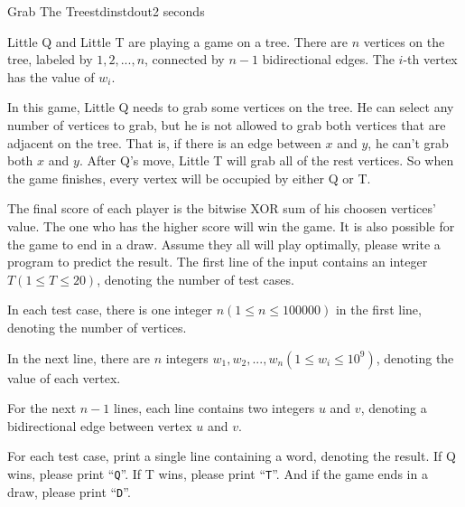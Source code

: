 \documentclass[11pt,a4paper,oneside]{article}
\newcommand{\txt}[1]{\mbox{``\texttt{#1}''}}
\newcommand{\timeLimit}{2 seconds}
\renewcommand{\defaultmemorylimit}{512 megabytes}
\begin{document}
\begin{problem}{Grab The Tree}{stdin}{stdout}{\timeLimit}

Little Q and Little T are playing a game on a tree. There are $n$ vertices on the tree, labeled by $1,2,...,n$, connected by $n-1$ bidirectional edges. The $i$-th vertex has the value of $w_i$.\par
In this game, Little Q needs to grab some vertices on the tree. He can select any number of vertices to grab, but he is not allowed to grab both vertices that are adjacent on the tree. That is, if there is an edge between $x$ and $y$, he can't grab both $x$ and $y$. After Q's move, Little T will grab all of the rest vertices. So when the game finishes, every vertex will be occupied by either Q or T.\par
The final score of each player is the bitwise XOR sum of his choosen vertices' value. The one who has the higher score will win the game. It is also possible for the game to end in a draw. Assume they all will play optimally, please write a program to predict the result.
\InputFile
The first line of the input contains an integer $T(1\leq T\leq20)$, denoting the number of test cases.\par
In each test case, there is one integer $n(1\leq n\leq 100000)$ in the first line, denoting the number of vertices.\par
In the next line, there are $n$ integers $w_1,w_2,...,w_n(1\leq w_i\leq 10^9)$, denoting the value of each vertex.\par
For the next $n-1$ lines, each line contains two integers $u$ and $v$, denoting a bidirectional edge between vertex $u$ and $v$.\par
\OutputFile
For each test case, print a single line containing a word, denoting the result. If Q wins, please print \txt{Q}. If T wins, please print \txt{T}. And if the game ends in a draw, please print \txt{D}.

\Examples
\begin{example}
%
\end{example}
\end{problem}
\renewcommand{\timeLimit}{2 seconds}
\renewcommand{\defaultmemorylimit}{512 megabytes}
\end{document}
